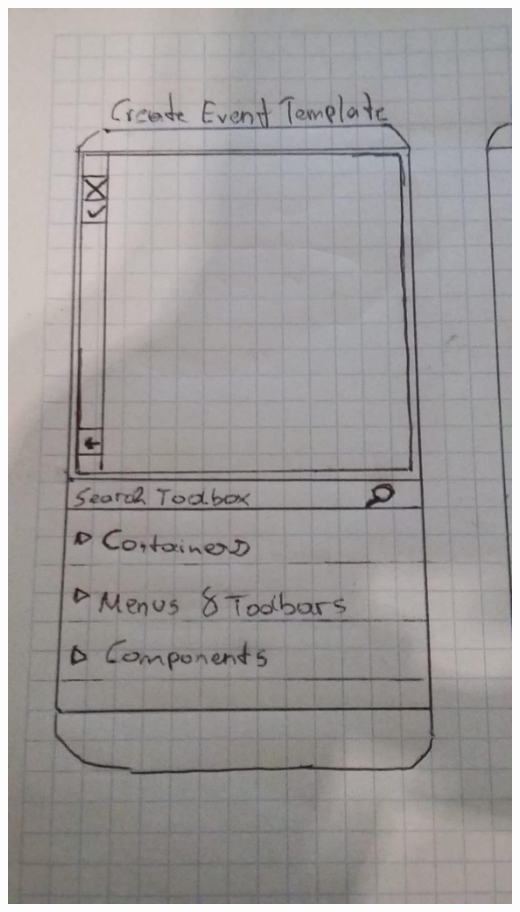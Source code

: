 \documentclass[12pt]{article}
\theoremstyle{definition}
\begin{document}
\includegraphics[scale=.2]{Gui/create_event.jpeg} \\
\end{document}
